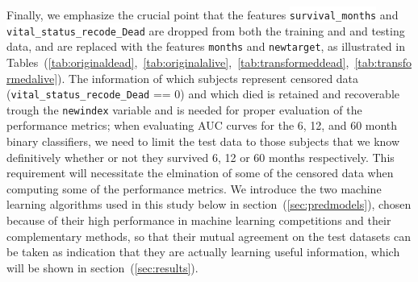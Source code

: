 \documentclass[a4paper,11pt]{article}
\newcommand{\codewhite}[1]{\colorbox{white}{\texttt{#1}}}
\begin{document}
Finally, we emphasize the crucial point that the features \codewhite{survival\_months} and \\
\codewhite{vital\_status\_recode\_Dead} are dropped from both the training and and testing data, and are replaced with the features \codewhite{months} and \codewhite{newtarget}, as illustrated in Tables~(\ref{tab:originaldead},~\ref{tab:originalalive},~\ref{tab:transformeddead},~\ref{tab:transformedalive}). The information of which subjects represent censored data (\codewhite{vital\_status\_recode\_Dead} == 0) and which died is retained and recoverable trough the \codewhite{newindex} variable and is needed for proper evaluation of the performance metrics; when evaluating AUC curves for the 6, 12, and 60 month binary classifiers, we need to limit the test data to those subjects that we know definitively whether or not they survived 6, 12 or 60 months respectively. This requirement will necessitate the elmination of some of the censored data when computing some of the performance metrics. We introduce the two machine learning algorithms used in this study below in section~(\ref{sec:predmodels}), chosen because of their high performance in machine learning competitions and their complementary methods, so that their mutual agreement on the test datasets can be taken as indication that they are actually learning useful information, which will be shown in section~(\ref{sec:results}).

\end{document}
